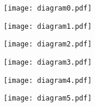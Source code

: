 \documentclass[10pt,a4paper,fleqn]{article}
\begin{document}
  \renewcommand{\labelenumi}{(\alph{enumi})}
  \renewcommand\headrule{\vspace{+2pt}\hrule}
  \newcommand{\solved}{\[\hfill\Box\]}
  \setlength{\headheight}{2.5\baselineskip}
  \pagestyle{fancyplain}

  
  \texttt{[image: diagram0.pdf]}
 
\texttt{[image: diagram1.pdf]}
 
\texttt{[image: diagram2.pdf]}
 
\texttt{[image: diagram3.pdf]}
 
\texttt{[image: diagram4.pdf]}
 
\texttt{[image: diagram5.pdf]}
 

  
\end{document}
